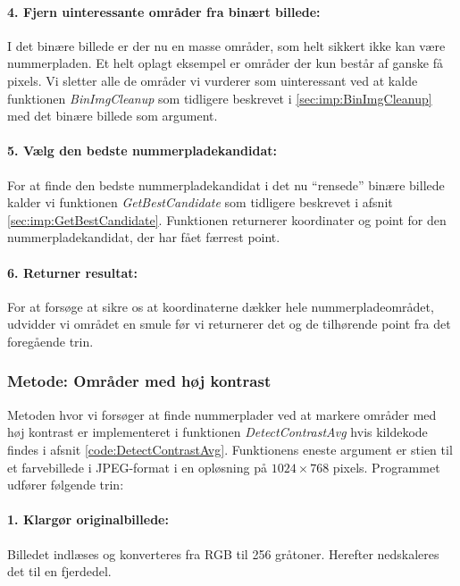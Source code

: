 \paragraph{4. Fjern uinteressante områder fra binært billede:}
I det binære billede er der nu en masse områder, som helt sikkert ikke kan være nummerpladen. Et helt oplagt eksempel er områder der kun består af ganske få pixels. Vi sletter alle de områder vi vurderer som uinteressant ved at kalde funktionen \textit{BinImgCleanup} som tidligere beskrevet i \vref{sec:imp:BinImgCleanup} med det binære billede som argument.

\paragraph{5. Vælg den bedste nummerpladekandidat:}
For at finde den bedste nummerpladekandidat i det nu ``rensede'' binære billede kalder vi funktionen \textit{GetBestCandidate} som tidligere beskrevet i afsnit \vref{sec:imp:GetBestCandidate}. Funktionen returnerer koordinater og point for den nummerpladekandidat, der har fået færrest point. 

\paragraph{6. Returner resultat:}
For at forsøge at sikre os at koordinaterne dækker hele nummerpladeområdet, udvidder vi området en smule før vi returnerer det og de tilhørende point fra det foregående trin. 


\subsubsection{Metode: Områder med høj kontrast}
Metoden hvor vi forsøger at finde nummerplader ved at markere områder med høj kontrast er implementeret i funktionen \textit{DetectContrastAvg} hvis kildekode findes i afsnit \vref{code:DetectContrastAvg}. Funktionens eneste argument er stien til et farvebillede i JPEG-format i en opløsning på $1024 \times 768$ pixels. Programmet udfører følgende trin:

\paragraph{1. Klargør originalbillede:}
Billedet indlæses og konverteres fra RGB til 256 gråtoner. Herefter nedskaleres det til en fjerdedel.

